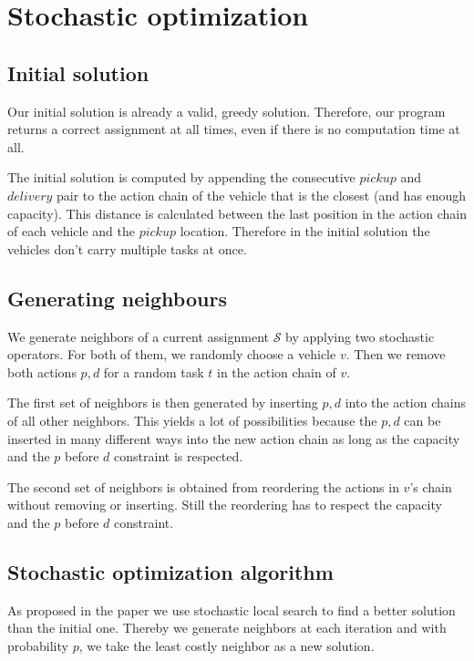 \documentclass[11pt]{article}
\begin{document}
\section{Stochastic optimization}

\subsection{Initial solution}

Our initial solution is already a valid, greedy solution. Therefore, our program
returns a correct assignment at all times, even if there is no computation time
at all.

The initial solution is computed by appending the consecutive $pickup$ and
$delivery$ pair to the action chain of the vehicle that is the closest (and has
enough capacity). This distance is calculated between the last position in the
action chain of each vehicle and the $pickup$ location. Therefore in the initial
solution the vehicles don't carry multiple tasks at once.


\subsection{Generating neighbours}

We generate neighbors of a current assignment $\mathcal{S}$ by applying two
stochastic operators. For both of them, we randomly choose a vehicle $v$. Then
we remove both actions $p, d$ for a random task $t$ in the action chain of $v$.

The first set of neighbors is then generated by inserting $p, d$ into the action
chains of all other neighbors. This yields a lot of possibilities because the
$p, d$ can be inserted in many different ways into the new action chain as long
as the capacity and the $p$ before $d$ constraint is respected.

The second set of neighbors is obtained from reordering the actions in $v$'s
chain without removing or inserting. Still the reordering has to respect the
capacity and the $p$ before $d$ constraint.


\subsection{Stochastic optimization algorithm}

As proposed in the paper \cite{paper} we use stochastic local search to find 
a better solution than the initial one. Thereby we generate neighbors at each 
iteration and with probability $p$, we take the least costly neighbor as a new 
solution.
\end{document}
